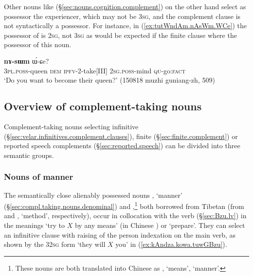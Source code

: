 Other nouns like  (§\ref{sec:nouns.cognition.complement}) on the other hand select as possessor the experiencer, which may not be \textsc{3sg}, and the complement clause is not syntactically a possessor. For instance, in (\ref{ex:tutWndAm.nAsWm.WCe}) the possessor of  is \textsc{2sg}, not \textsc{3sg} as would be expected if the finite clause  where the possessor of this noun.

 \begin{exe}
\ex \label{ex:tutWndAm.nAsWm.WCe}
 \textbf{nɤ-sɯm} ɯ́-ɕe? \\
\textsc{3pl}.\textsc{poss}-queen \textsc{dem} \textsc{ipfv}-2-take[III] \textsc{2sg}.\textsc{poss}-mind \textsc{qu}-go:\textsc{fact} \\
\glt `Do you want to become their queen?' (150818 muzhi guniang-zh, 509)
\end{exe}

\subsection{Overview of complement-taking nouns} \label{sec:complement.taking.noun.list}
Complement-taking nouns selecting infinitive (§\ref{sec:velar.infinitives.complement.clauses}), finite (§\ref{sec:finite.complement}) or reported speech complements (§\ref{sec:reported.speech}) can be divided into three semantic groups.

\subsubsection{Nouns of manner} \label{sec:nouns.manner.complement}
The semantically close alienably possessed nouns  , `manner' (§\ref{sec:compl.taking.nouns.denominal}) and ,\footnote{These nouns are both translated into Chinese as , `means', `manner'.} both borrowed from Tibetan (from  and , `method', respectively), occur in collocation with the verb  (§\ref{sec:Bzu.lv}) in the meanings `try to $X$ by any means' (in Chinese ) or `prepare'. They can select an infinitive clause with raising of the person indexation on the main verb, as shown by the 3\fl{}\textsc{2sg} form  `they will $X$ you' in (\ref{ex:kAndza.kowa.tuwGBzu}). 
   


